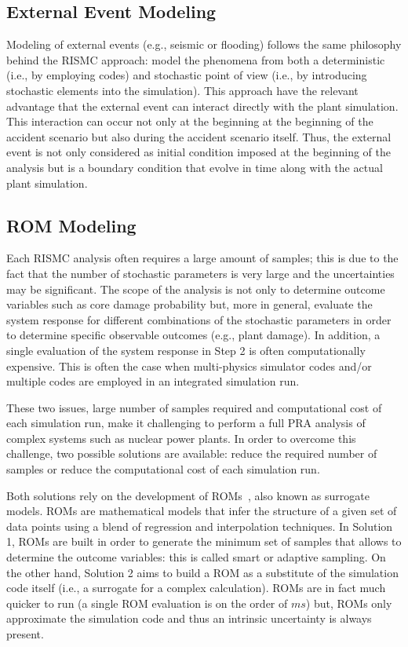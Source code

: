 \subsection{External Event Modeling}
Modeling of external events (e.g., seismic or flooding) follows the same philosophy behind the RISMC
approach: model the phenomena from both a deterministic (i.e., by employing codes) and stochastic 
point of view (i.e., by introducing stochastic elements into the simulation). This approach have the 
relevant advantage that the external event can interact directly with the plant simulation. 
This interaction can occur not only at the beginning at the beginning of the accident scenario but also
during the accident scenario itself. Thus, the external event is not only considered as initial condition
imposed at the beginning of the analysis but is a boundary condition that evolve in time along with the
actual plant simulation.

\subsection{ROM Modeling}
Each RISMC analysis often requires a large amount of samples; this is due to the fact that the 
number of stochastic parameters is very large and the uncertainties may be significant. 
The scope of the analysis is not only to determine outcome variables such as core damage probability 
but, more in general, evaluate the system response for different combinations of the stochastic
parameters in order to determine specific observable outcomes (e.g., plant damage). In addition, 
a single evaluation of the system response in Step 2 is often computationally expensive. 
This is often the case when multi-physics simulator codes and/or multiple codes are employed in an 
integrated simulation run.

These two issues, large number of samples required and computational cost of each simulation run, 
make it challenging to perform a full PRA analysis of complex systems such as nuclear power plants.  
In order to overcome this challenge, two possible solutions are available: reduce the required 
number of samples or reduce the computational cost of each simulation run.

Both solutions rely on the development of ROMs~\cite{ROM_Khalik}, also known as surrogate models. 
ROMs are mathematical models that infer the structure of a given set of data points using a
blend of regression and interpolation techniques. In Solution 1, ROMs are built in order to generate 
the minimum set of samples that allows to determine the outcome variables: this is called smart or 
adaptive sampling. On the other hand, Solution 2 aims to build a ROM as a substitute of the simulation 
code itself (i.e., a surrogate for a complex calculation).  ROMs are in fact much quicker to run 
(a single ROM evaluation is on the order of $ms$) but, ROMs only approximate the simulation code and 
thus an intrinsic uncertainty is always present.

